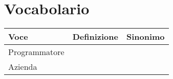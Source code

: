 \section {Vocabolario}

\begin{table}[ht]
\begin{tabularx}{\textwidth}{|X|X|X|}
\hline
Voce & Definizione & Sinonimo \\
\hline
Programmatore & & \\
\hline
Azienda & & \\
\hline
\end{tabularx}
\end{table}